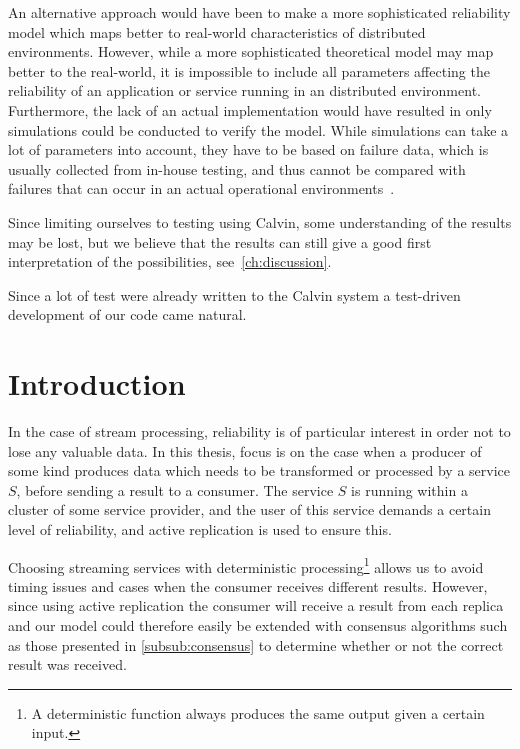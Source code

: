 \documentclass{cslthse-msc}
\begin{document}
An alternative approach would have been to make a more sophisticated reliability model which maps better to real-world characteristics of distributed environments. However, while a more sophisticated theoretical model may map better to the real-world, it is impossible to include all parameters affecting the reliability of an application or service running in an distributed environment. Furthermore, the lack of an actual implementation would have resulted in only simulations could be conducted to verify the model. While simulations can take a lot of parameters into account, they have to be based on failure data, which is usually collected from in-house testing, and thus cannot be compared with failures that can occur in an actual operational environments~\cite{surveyReliabilityDistr}.

Since limiting ourselves to testing using Calvin, some understanding of the results may be lost, but we believe that the results can still give a good first interpretation of the possibilities, see~\cref{ch:discussion}. 

Since a lot of test were already written to the Calvin system a test-driven development of our code came natural.

\section{Introduction} \label{sec:design_intro}
In the case of stream processing, reliability is of particular interest in order not to lose any valuable data. In this thesis, focus is on the case when a producer of some kind produces data which needs to be transformed or processed by a service $S$, before sending a result to a consumer. The service $S$ is running within a cluster of some service provider, and the user of this service demands a certain level of reliability, and active replication is used to ensure this.	

Choosing streaming services with deterministic processing\footnote{A deterministic function always produces the same output given a certain input.} allows us to avoid timing issues and cases when the consumer receives different results. However, since using active replication the consumer will receive a result from each replica and our model could therefore easily be extended with consensus algorithms such as those presented in \cref{subsub:consensus} to determine whether or not the correct result was received. 
\end{document}
